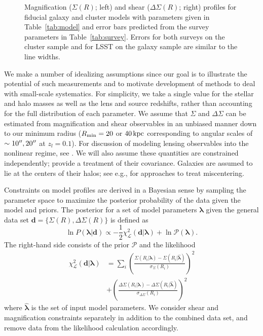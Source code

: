 \documentclass[12pt]{emulateapj}
\begin{document}
\begin{figure*}[htb]
\caption{Magnification ($\Sigma(R)$; left) and shear
  ($\Delta\Sigma(R)$; right) profiles for fiducial galaxy and cluster models with
  parameters given in Table~\ref{tab:model} and error bars predicted
  from the survey parameters in Table~\ref{tab:survey}. Errors for
  both surveys on the cluster sample and for LSST on the galaxy sample
are similar to the line widths.}
\label{fig:fiducial}
\end{figure*}


We make a number of idealizing assumptions since our goal is to
illustrate the potential of such measurements and to motivate
development of methods to deal with small-scale systematics. For
simplicity, we take a single value for the stellar and halo masses as well as
the lens and source redshifts, rather than accounting for the full
distribution of each parameter. We assume that $\Sigma$ and
$\Delta\Sigma$ can be estimated from magnification and shear
observables in an unbiased manner down to our minimum radius ($R_{\rm
  min} = 20$ or $40\,\rm{kpc}$ corresponding to angular scales of
$\sim10\mbox{$^{\prime\prime}$}, 20\mbox{$^{\prime\prime}$}$ at $z_l=0.1$). For discussion of modeling
lensing observables into the nonlinear regime, see \citet{Menard2003,
  Takada2003, Mandelbaum2006}. We will also assume these quantities
are constrained independently; \citet{Rozo2010} provide a treatment
of their covariance. Galaxies are assumed to lie at the centers of
their halos; see e.g., \citet{Johnston2007, George2012} for
approaches to treat miscentering.

Constraints on model profiles are derived in a Bayesian sense by
sampling the parameter space to maximize the posterior probability of
the data given the model and priors. The posterior for a set of model
parameters ${\bm \lambda}$ given the general data set ${\bm
  d}=\{\Sigma(R),\Delta\Sigma(R)\}$ is defined as 
\begin{equation}
\ln P({\bm \lambda}| {\bm d}) \propto
-\frac{1}{2}\chi^2_\mathcal{L}({\bm d}|{\bm \lambda}) + \ln{\mathcal P}({\bm \lambda}).
\end{equation}
The right-hand side consists of the prior ${\mathcal P}$ and the likelihood
\begin{equation}\begin{split}
\chi^2_{\mathcal L}({\bm d}|{\bm \lambda}) &=
\sum_{i}\left(\frac{\Sigma(R_i|{\bm \lambda}) -
      \Sigma(R_i|{\hat{\bm \lambda}})}{\sigma_{\Sigma}(R_i)}\right)^2 \\
&  + \left(\frac{\Delta\Sigma(R_i|{\bm \lambda}) -
      \Delta\Sigma(R_i|{\hat{\bm \lambda}})}{\sigma_{\Delta\Sigma}(R_i)}\right)^2
\end{split}\end{equation}
where $\hat{\bm \lambda}$ is the set of input model parameters. We
consider shear and magnification constraints separately in addition to
the combined data set, and remove data from the likelihood calculation
accordingly.
\end{document}
